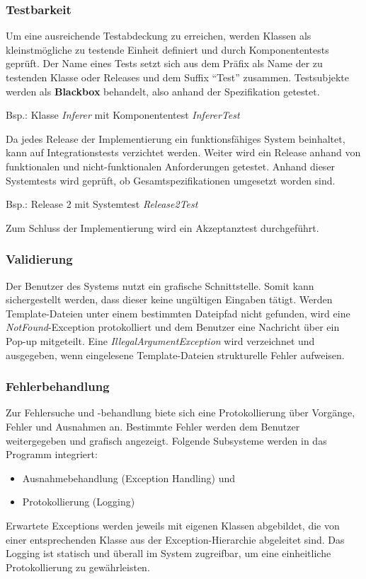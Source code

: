 \documentclass[11pt]{article}
\begin{document}
    \subsubsection{Testbarkeit}
    Um eine ausreichende Testabdeckung zu erreichen, werden Klassen als kleinstmögliche zu testende Einheit definiert
    und durch Komponententests geprüft.
    Der Name eines Tests setzt sich aus dem Präfix als Name der zu testenden Klasse oder Releases und dem Suffix
    "`Test"'
    zusammen.
    Testsubjekte werden als \textbf{Blackbox} behandelt, also anhand der Spezifikation getestet.
    \begin{center}
        Bsp.: Klasse \textit{Inferer} mit Komponententest \textit{InfererTest}
    \end{center}
    Da jedes Release der Implementierung ein funktionsfähiges System beinhaltet, kann auf Integrationstests
    verzichtet werden.
    Weiter wird ein Release anhand von funktionalen und nicht-funktionalen Anforderungen getestet.
    Anhand dieser Systemtests wird geprüft, ob Gesamtspezifikationen umgesetzt worden sind.
    \begin{center}
        Bsp.: Release 2 mit Systemtest \textit{Release2Test}
    \end{center}
    Zum Schluss der Implementierung wird ein Akzeptanztest durchgeführt.

    \subsubsection{Validierung}
    Der Benutzer des Systems nutzt ein grafische Schnittstelle.
    Somit kann sichergestellt werden, dass dieser keine ungültigen Eingaben tätigt.
    Werden Template-Dateien unter einem bestimmten Dateipfad nicht gefunden, wird eine \textit{NotFound}-Exception
    protokolliert und dem Benutzer eine Nachricht über ein Pop-up mitgeteilt.
    Eine \textit{IllegalArgumentException} wird verzeichnet und ausgegeben, wenn eingelesene Template-Dateien
    strukturelle Fehler aufweisen.

    \subsubsection{Fehlerbehandlung}
    Zur Fehlersuche und -behandlung biete sich eine Protokollierung über Vorgänge, Fehler und Ausnahmen an.
    Bestimmte Fehler werden dem Benutzer weitergegeben und grafisch angezeigt.
    Folgende Subsysteme werden in das Programm integriert:
    \begin{itemize}
        \item Ausnahmebehandlung (Exception Handling) und
        \item Protokollierung (Logging)
    \end{itemize}
    Erwartete Exceptions werden jeweils mit eigenen Klassen abgebildet, die von einer entsprechenden Klasse aus der
    Exception-Hierarchie abgeleitet sind.
    Das Logging ist statisch und überall im System zugreifbar, um eine einheitliche Protokollierung zu gewährleisten.
\end{document}
